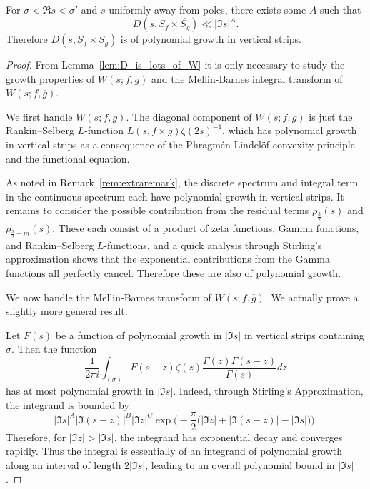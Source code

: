 \begin{lemma}\label{lem:DsSfSg_poly_growth}
  For $\sigma < \Re s < \sigma'$ and $s$ uniformly away from poles, there exists some $A$
  such that
  \begin{equation}
    D(s, S_f \times \overline{S_g}) \ll \lvert \Im s \rvert^A.
  \end{equation}
  Therefore $D(s, S_f \times \overline{S_g})$ is of polynomial growth in vertical strips.
\end{lemma}


\begin{proof}
  From Lemma~\ref{lem:D_is_lots_of_W} it is only necessary to study the growth properties
  of $W(s; f, \overline{g})$ and the Mellin-Barnes integral transform of $W(s; f,
  \overline{g})$.


  We first handle $W(s; f, \overline{g})$.
  The diagonal component of $W(s; f, \overline{g})$ is just the Rankin--Selberg %
  $L$-function $L(s, f\times \overline{g}) \zeta(2s)^{-1}$, which has polynomial growth in
  vertical strips as a consequence of the Phragm\'{e}n-Lindel\"{o}f convexity principle
  and the functional equation.


  As noted in Remark~\ref{rem:extraremark}, the discrete spectrum and integral term in the
  continuous spectrum each have polynomial growth in vertical strips.
  It remains to consider the possible contribution from the residual terms
  $\rho_{\frac{3}{2}}(s)$ and $\rho_{\frac{3}{2} - m}(s)$.
  These each consist of a product of zeta functions, Gamma functions,
  and Rankin--Selberg %
  $L$-functions, and a quick analysis through Stirling's approximation shows that the
  exponential contributions from the Gamma functions all perfectly cancel.
  Therefore these are also of polynomial growth.


  We now handle the Mellin-Barnes transform of $W(s; f, \overline{g})$.
  We actually prove a slightly more general result.


  Let $F(s)$ be a function of polynomial growth in $\lvert \Im s \rvert$ in vertical
  strips containing $\sigma$.
  Then the function
  \begin{equation}
    \frac{1}{2\pi i} \int_{(\sigma)}F(s-z)\zeta(z) \frac{\Gamma(z) \Gamma(s -
    z)}{\Gamma(s)} dz
  \end{equation}
  has at most polynomial growth in $\lvert \Im s \rvert$.
  Indeed, through Stirling's Approximation, the integrand is bounded by
  \begin{equation}
    \lvert \Im s \rvert^A \lvert \Im (s-z) \rvert^B \lvert \Im z \rvert^C
    \exp\bigg(-\frac{\pi}{2}\Big(\lvert \Im z \rvert + \lvert \Im(s-z) \rvert - \lvert \Im
    s \rvert \Big)\bigg).
  \end{equation}
  Therefore, for $\lvert \Im z \rvert > \lvert \Im s \rvert$, the integrand has
  exponential decay and converges rapidly.
  Thus the integral is essentially of an integrand of polynomial growth along an interval
  of length $2 \lvert \Im s \rvert$, leading to an overall polynomial bound in $\lvert \Im
  s \rvert$.
\end{proof}


